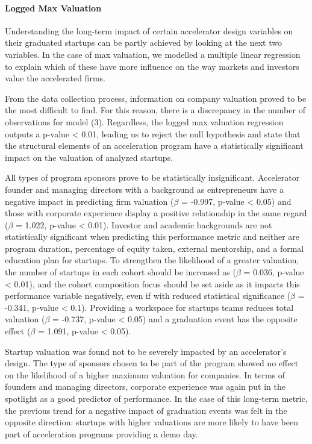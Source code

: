 \documentclass[
  12pt,
]{article}
\begin{document}
\hypertarget{logged-max-valuation}{%
\paragraph{Logged Max Valuation}\label{logged-max-valuation}}

Understanding the long-term impact of certain accelerator design variables on their graduated startups can be partly achieved by looking at the next two variables. In the case of max valuation, we modelled a multiple linear regression to explain which of these have more influence on the way markets and investors value the accelerated firms.

From the data collection process, information on company valuation proved to be the most difficult to find. For this reason, there is a discrepancy in the number of observations for model (3). Regardless, the logged max valuation regression outputs a p-value \textless{} 0.01, leading us to reject the null hypothesis and state that the structural elements of an acceleration program have a statistically significant impact on the valuation of analyzed startups.

All types of program sponsors prove to be statistically insignificant. Accelerator founder and managing directors with a background as entrepreneurs have a negative impact in predicting firm valuation (\(\beta\) = -0.997, p-value \textless{} 0.05) and those with corporate experience display a positive relationship in the same regard (\(\beta\) = 1.022, p-value \textless{} 0.01). Investor and academic backgrounds are not statistically significant when predicting this performance metric and neither are program duration, percentage of equity taken, external mentorship, and a formal education plan for startups. To strengthen the likelihood of a greater valuation, the number of startups in each cohort should be increased as (\(\beta\) = 0.036, p-value \textless{} 0.01), and the cohort composition focus should be set aside as it impacts this performance variable negatively, even if with reduced statistical significance (\(\beta\) = -0.341, p-value \textless{} 0.1). Providing a workspace for startups teams reduces total valuation (\(\beta\) = -0.737, p-value \textless{} 0.05) and a graduation event has the opposite effect (\(\beta\) = 1.091, p-value \textless{} 0.05).

Startup valuation was found not to be severely impacted by an accelerator's design. The type of sponsors chosen to be part of the program showed no effect on the likelihood of a higher maximum valuation for companies. In terms of founders and managing directors, corporate experience was again put in the spotlight as a good predictor of performance. In the case of this long-term metric, the previous trend for a negative impact of graduation events was felt in the opposite direction: startups with higher valuations are more likely to have been part of acceleration programs providing a demo day.
\end{document}
